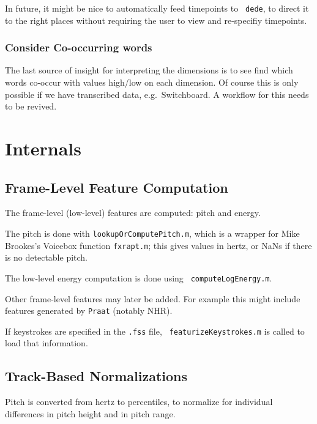 \documentclass[11pt]{article}
\begin{document}
In future, it might be nice to automatically feed timepoints to {\tt
  dede}, to direct it to the right places without requiring the user
to view and re-specifiy timepoints.


\subsubsection{Consider Co-occurring words} 

The last source of insight for interpreting the dimensions is to see
find which words co-occur with values high/low on each dimension.  Of
course this is only possible if we have transcribed data,
e.g.~Switchboard.  A
workflow for this needs to be revived.


\section{Internals}

\subsection{Frame-Level Feature Computation}

The frame-level (low-level) features are computed: pitch and energy.

The pitch is done with {\tt lookupOrComputePitch.m}, which is a
wrapper for Mike Brookes's Voicebox function {\tt fxrapt.m}; this
gives values in hertz, or NaNs if there is no detectable pitch.

The low-level energy computation is done using {\tt
  computeLogEnergy.m}.

Other frame-level features may later be added.  For example this might
include features  generated by {\tt Praat} (notably NHR).  

If keystrokes are specified in the {\tt .fss} file, {\tt
  featurizeKeystrokes.m} is called to load that information.

\subsection{Track-Based Normalizations}

Pitch is converted from hertz to percentiles, to normalize for
individual differences in pitch height and in pitch range.
\end{document}
